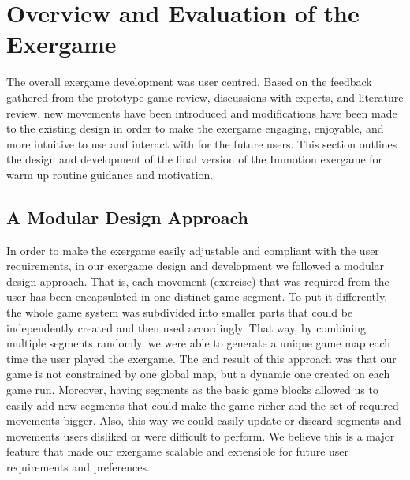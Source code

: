 \chapter{Overview and Evaluation of the Exergame}\label{chapter:finaldesign}
The overall exergame development was user centred. Based on the feedback gathered from the prototype game review, discussions with experts, and literature review, new movements have been introduced and modifications have been made to the existing design in order to make the exergame engaging, enjoyable, and more intuitive to use and interact with for the future users. This section outlines the design and development of the final version of the Immotion exergame for warm up routine guidance and motivation.
\section{A Modular Design Approach}
In order to make the exergame easily adjustable and compliant with the user requirements, in our exergame design and development we followed a modular design approach. That is, each movement (exercise) that was required from the user has been encapsulated in one distinct game segment. To put it differently, the whole game system was subdivided into smaller parts that could be independently created and then used accordingly. That way, by combining multiple segments randomly, we were able to generate a unique game map each time the user played the exergame. The end result of this approach was that our game is not constrained by one global map, but a dynamic one created on each game run. Moreover, having segments as the basic game blocks allowed us to easily add new segments that could make the game richer and the set of required movements bigger. Also, this way we could easily update or discard segments and movements users disliked or were difficult to perform. We believe this is a major feature that made our exergame scalable and extensible for future user requirements and preferences. 
